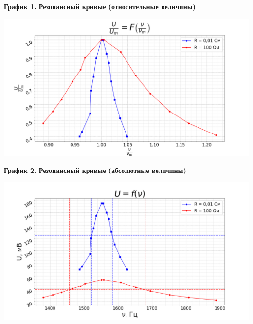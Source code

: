 \documentclass[15pt,a5paper,reqno]{article}
\begin{document}
    \noindent\hypertarget{graph_1}{\textbf{График 1. Резонансный кривые (относительные величины)}}
    \begin{center}
        \includegraphics[width = \textwidth]{images/graph_1.png}
    \end{center}
    \noindent\hypertarget{graph_2}{\textbf{График 2. Резонансный кривые (абсолютные величины)}}
    \begin{center}
        \includegraphics[width = \textwidth]{images/graph_2.png}
    \end{center}
\end{document}
